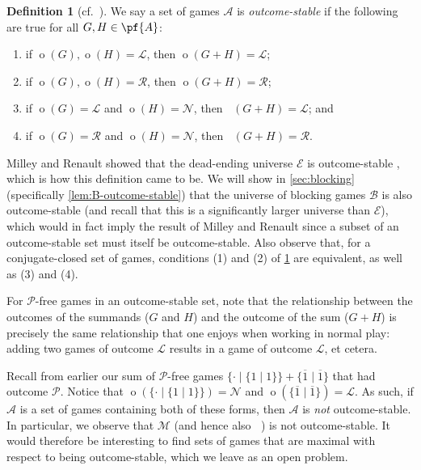 \documentclass[11pt]{article}
\theoremstyle{definition}
\newtheorem{definition}[theorem]{Definition}
\DeclareMathOperator{\outcome}{o}
\DeclareMathOperator{\outcomeL}{o_L}
\DeclareMathOperator{\outcomeR}{o_R}
\newcommand{\set}[1]{\mathcal{#1}}
\DeclareMathOperator{\maug}{\set{M}_\text{aug}}
\begin{document}
\begin{definition}[cf.\ {\cite[Theorem 4 on p.~4]{milley.renault:invertible}}]
    \label{def:outcome-stable}
    We say a set of games $\set{A}$ is \emph{outcome-stable} if the following
    are true for all $G,H\in\pf{A}$:
    \begin{enumerate}
        \item
            if $\outcome(G),\outcome(H)=\mathscr{L}$, then
            $\outcome(G+H)=\mathscr{L}$;
        \item
            if $\outcome(G),\outcome(H)=\mathscr{R}$, then
            $\outcome(G+H)=\mathscr{R}$;
        \item
            if $\outcome(G)=\mathscr{L}$ and $\outcome(H)=\mathscr{N}$, then
            $\outcomeL(G+H)=\mathscr{L}$; and
        \item
            if $\outcome(G)=\mathscr{R}$ and $\outcome(H)=\mathscr{N}$, then
            $\outcomeR(G+H)=\mathscr{R}$.
    \end{enumerate}
\end{definition}

Milley and Renault showed that the dead-ending universe $\set{E}$ is
outcome-stable \cite[Theorem 4 on p.~4]{milley.renault:invertible}, which is
how this definition came to be. We will show in \cref{sec:blocking}
(specifically \cref{lem:B-outcome-stable}) that the universe of blocking games
$\set{B}$ is also outcome-stable (and recall that this is a significantly
larger universe than $\set{E}$), which would in fact imply the result of Milley
and Renault since a subset of an outcome-stable set must itself be
outcome-stable. Also observe that, for a conjugate-closed set of games,
conditions (1) and (2) of \cref{def:outcome-stable} are equivalent, as well as
(3) and (4).

For $\mathscr{P}$-free games in an outcome-stable set, note that the
relationship between the outcomes of the summands ($G$ and $H$) and the outcome
of the sum ($G+H$) is precisely the same relationship that one enjoys when
working in normal play: adding two games of outcome $\mathscr{L}$ results in a
game of outcome $\mathscr{L}$, et cetera.

Recall from earlier our sum of $\mathscr{P}$-free games
$\{\cdot\mid\{1\mid1\}\}+\{\overline{1}\mid\overline{1}\}$ that had outcome
$\mathscr{P}$. Notice that $\outcome(\{\cdot\mid\{1\mid1\}\})=\mathscr{N}$ and
$\outcome(\{\overline{1}\mid\overline{1}\})=\mathscr{L}$. As such, if $\set{A}$
is a set of games containing both of these forms, then $\set{A}$ is \emph{not}
outcome-stable. In particular, we observe that $\set{M}$ (and hence also
$\maug$) is not outcome-stable. It would therefore be interesting to find sets
of games that are maximal with respect to being outcome-stable, which we leave
as an open problem.
\end{document}
